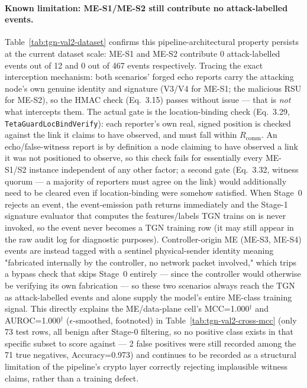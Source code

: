 \paragraph{Known limitation: ME-S1/ME-S2 still contribute no attack-labelled events.}
Table~\ref{tab:tgn-val2-dataset} confirms this pipeline-architectural
property persists at the current dataset scale: ME-S1 and ME-S2 contribute
0 attack-labelled events out of 12 and 0 out of 467 events respectively.
Tracing the exact interception mechanism: both scenarios' forged echo
reports carry the attacking node's own genuine identity and signature (V3/V4
for ME-S1; the malicious RSU for ME-S2), so the HMAC check (Eq.~3.15)
passes without issue — that is \emph{not} what intercepts them. The actual
gate is the location-binding check (Eq.~3.29, \texttt{TetaGuardLocBindVerify}):
each reporter's own real, signed position is checked against the link it
claims to have observed, and must fall within $R_{\text{comm}}$. An
echo/false-witness report is by definition a node claiming to have
observed a link it was not positioned to observe, so this check fails for
essentially every ME-S1/S2 instance independent of any other factor; a
second gate (Eq.~3.32, witness quorum — a majority of reporters must agree
on the link) would additionally need to be cleared even if location-binding
were somehow satisfied. When Stage~0 rejects an event, the event-emission
path returns immediately and the Stage-1 signature evaluator that computes
the features/labels TGN trains on is never invoked, so the event never
becomes a TGN training row (it may still appear in the raw audit log for
diagnostic purposes). Controller-origin ME (ME-S3, ME-S4) events are
instead tagged with a sentinel physical-sender identity meaning "fabricated
internally by the controller, no network packet involved," which trips a
bypass check that skips Stage~0 entirely — since the controller would
otherwise be verifying its own fabrication — so these two scenarios always
reach the TGN as attack-labelled events and alone supply the model's
entire ME-class training signal. This directly explains the ME/data-plane
cell's MCC=1.000$^\dagger$ and AUROC=1.000$^\dagger$ ($\epsilon$-smoothed,
footnoted) in Table~\ref{tab:tgn-val2-cross-mcc} (only 73 test rows, all
benign after Stage-0 filtering, so no positive class exists in that
specific subset to score against — 2 false positives were still recorded
among the 71 true negatives, Accuracy=0.973) and continues to be recorded
as a structural limitation of the pipeline's crypto layer correctly
rejecting implausible witness claims, rather than a
training defect.
